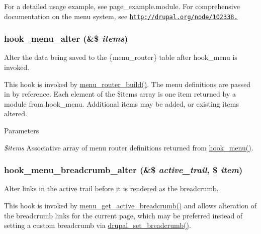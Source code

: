 For a detailed usage example, see page\_\-example.module. For comprehensive documentation on the menu system, see \href{http://drupal.org/node/102338.}{\tt http://drupal.org/node/102338.} \hypertarget{group__hooks_ga4c37deddcf48dbfe6f3081df1652f6fa}{
\subsubsection[{hook\_\-menu\_\-alter}]{\setlength{\rightskip}{0pt plus 5cm}hook\_\-menu\_\-alter (\&\$ {\em items})}}
\label{group__hooks_ga4c37deddcf48dbfe6f3081df1652f6fa}
Alter the data being saved to the \{menu\_\-router\} table after hook\_\-menu is invoked.

This hook is invoked by \hyperlink{group__menu_ga1f6713b93173302fb29d7bc9578b7530}{menu\_\-router\_\-build()}. The menu definitions are passed in by reference. Each element of the \$items array is one item returned by a module from hook\_\-menu. Additional items may be added, or existing items altered.


\begin{DoxyParams}{Parameters}
\item[{\em \$items}]Associative array of menu router definitions returned from \hyperlink{group__hooks_ga5c95244fea59b25666e409759e133ded}{hook\_\-menu()}. \end{DoxyParams}
\hypertarget{group__hooks_ga5a6dd6ead08b6dab4fe1307eb599e34a}{
\subsubsection[{hook\_\-menu\_\-breadcrumb\_\-alter}]{\setlength{\rightskip}{0pt plus 5cm}hook\_\-menu\_\-breadcrumb\_\-alter (\&\$ {\em active\_\-trail}, \/  \$ {\em item})}}
\label{group__hooks_ga5a6dd6ead08b6dab4fe1307eb599e34a}
Alter links in the active trail before it is rendered as the breadcrumb.

This hook is invoked by \hyperlink{group__menu_ga009731c4b3e736ebb620ba90e7f04207}{menu\_\-get\_\-active\_\-breadcrumb()} and allows alteration of the breadcrumb links for the current page, which may be preferred instead of setting a custom breadcrumb via \hyperlink{common_8inc_a666113d06fa6ea461aff580e5c511eb0}{drupal\_\-set\_\-breadcrumb()}.

